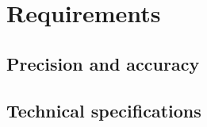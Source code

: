\section{Requirements}

\subsection{Precision and accuracy}


\subsection{Technical specifications}


